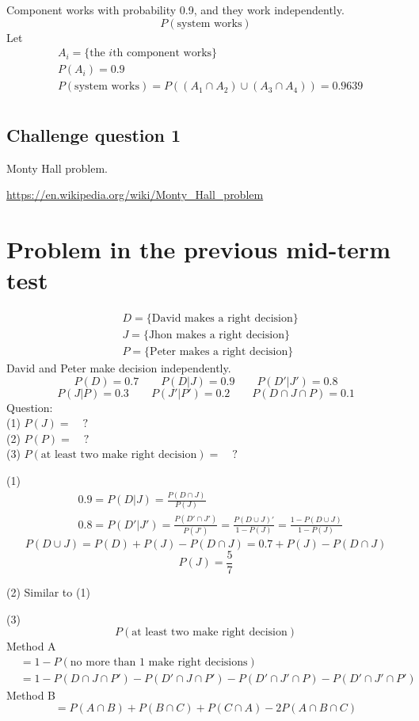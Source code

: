 \begin{exmp}
Component works with probability 0.9, and they work independently.
\[P(\text{system works})\]
Let
\begin{align*}
&A_i=\{ \text{the }i\text{th component works} \}	\\
&P(A_i)=0.9	\\
&P(\text{system works})=P\left( (A_1 \cap A_2)\cup(A_3 \cap A_4) \right)=0.9639\\
\end{align*}
\end{exmp}

\subsection{Challenge question 1}
Monty Hall problem.

\url{https://en.wikipedia.org/wiki/Monty_Hall_problem}


\section{Problem in the previous mid-term test}
 \begin{exmp}
 \begin{align*}
   &D=\{\text{David makes a right decision}\}	\\
   &J=\{\text{Jhon makes a right decision}\}	\\
   &P=\{\text{Peter makes a right decision}\}	
 \end{align*}
David and Peter make decision independently.
  \[  P(D) = 0.7 \qquad P(D|J)=0.9 \qquad P(D'|J')=0.8  \]
  \[  P(J|P)=0.3 \qquad P(J'|P')=0.2 \qquad P(D \cap J\cap P)=0.1 \]
  Question: \\
  (1) $P(J)= \quad ?$ \\
  (2) $P(P)= \quad ?$ \\
  (3) $P(\text{at least two make right decision})=\quad ?$
\end{exmp}

\begin{solution}
  (1)
  \begin{align*}
  &0.9=P(D|J)=\frac{P(D \cap J)}{P(J)}  \\
  &0.8=P(D'|J')=\frac{P(D'\cap J')}{P(J')}=\frac{P(D\cup J)'}{1-P(J)}=\frac{1-P(D\cup J)}{1-P(J)}
  \end{align*}
  \[P(D\cup J)=P(D)+P(J)-P(D \cap J)=0.7+P(J)-P(D \cap J)\]
  \[P(J)=\frac{5}{7}\]

  (2) Similar to (1)

  (3)
  \[P(\text{at least two make right decision})\]
Method A
\begin{align*}
  &=1-P(\text{no more than 1 make right decisions})\\
  &=1-P(D \cap J \cap P')-P(D' \cap J \cap P')-P(D' \cap J' \cap P)-P(D' \cap J' \cap P')
\end{align*}
Method B
\[ =P(A \cap B)+P(B \cap C) + P(C \cap A)-2 P(A\cap B \cap C)\]
\end{solution}